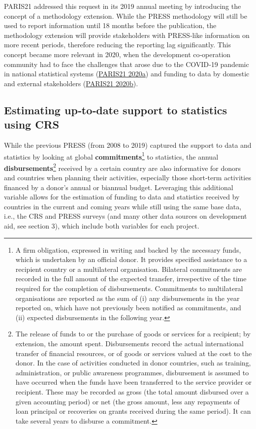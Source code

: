\documentclass[
]{article}
\begin{document}
PARIS21 addressed this request in its 2019 annual meeting by introducing the concept of a
methodology extension. While the PRESS methodology will still be used to report information until 18
months before the publication, the methodology extension will provide stakeholders with PRESS‐like
information on more recent periods, therefore reducing the reporting lag significantly. This concept
became more relevant in 2020, when the development co‐operation community had to face the
challenges that arose due to the COVID‐19 pandemic in national statistical systems (\protect\hyperlink{ref-PARIS21-Covid}{PARIS21 2020a})
and funding to data by domestic and external stakeholders (\protect\hyperlink{ref-PRESS-2021}{PARIS21 2020b}).

\hypertarget{estimating-using-CRS}{%
\subsection{Estimating up‐to‐date support to statistics using CRS}\label{estimating-using-CRS}}

While the previous PRESS (from 2008 to 2019) captured the support to data and statistics by looking
at global \textbf{commitments}\footnote{A firm obligation, expressed in writing and backed by the necessary funds, which is undertaken by an official
  donor. It provides specified assistance to a recipient country or a multilateral organisation. Bilateral
  commitments are recorded in the full amount of the expected transfer, irrespective of the time required for the
  completion of disbursements. Commitments to multilateral organisations are reported as the sum of (i) any
  disbursements in the year reported on, which have not previously been notified as commitments, and (ii)
  expected disbursements in the following year.}
to statistics, the annual \textbf{disbursements}\footnote{The release of funds to or the purchase of goods or services for a recipient; by extension, the amount spent. Disbursements record the actual international transfer of financial resources, or of goods or services valued at
  the cost to the donor. In the case of activities conducted in donor countries, such as training, administration, or
  public awareness programmes, disbursement is assumed to have occurred when the funds have been
  transferred to the service provider or recipient. These may be recorded as gross (the total amount disbursed
  over a given accounting period) or net (the gross amount, less any repayments of loan principal or recoveries
  on grants received during the same period). It can take several years to disburse a commitment.}
received by a certain country are also informative for donors and countries when planning their activities, especially those short‐term
activities financed by a donor's annual or biannual budget. Leveraging this additional variable allows
for the estimation of funding to data and statistics received by countries in the current and coming
years while still using the same base data, i.e., the CRS and PRESS surveys (and many other data
sources on development aid, see section 3), which include both variables for each project.
\end{document}
